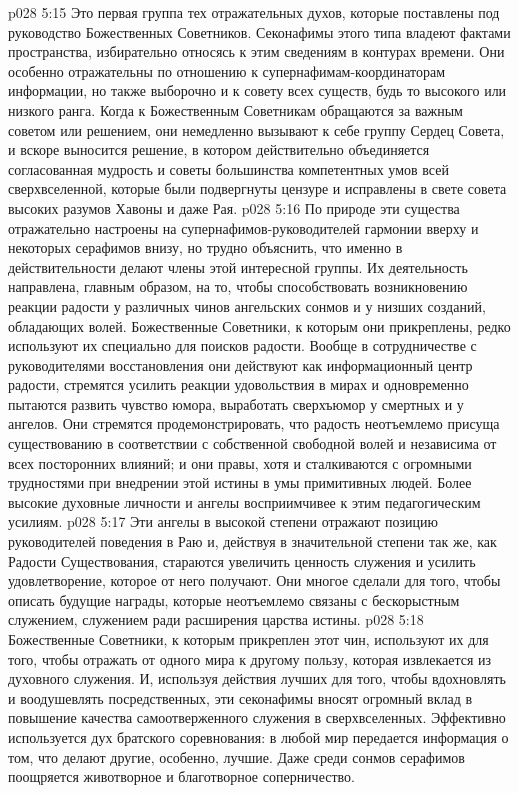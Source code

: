 \vs p028 5:15 \bibnobreakspace {} Это первая группа тех отражательных духов, которые поставлены под руководство Божественных Советников. Секонафимы этого типа владеют фактами пространства, избирательно относясь к этим сведениям в контурах времени. Они особенно отражательны по отношению к супернафимам\hyp{}координаторам информации, но также выборочно и к совету всех существ, будь то высокого или низкого ранга. Когда к Божественным Советникам обращаются за важным советом или решением, они немедленно вызывают к себе группу Сердец Совета, и вскоре выносится решение, в котором действительно объединяется согласованная мудрость и советы большинства компетентных умов всей сверхвселенной, которые были подвергнуты цензуре и исправлены в свете совета высоких разумов Хавоны и даже Рая.
\vs p028 5:16 \bibnobreakspace {} По природе эти существа отражательно настроены на супернафимов\hyp{}руководителей гармонии вверху и некоторых серафимов внизу, но трудно объяснить, что именно в действительности делают члены этой интересной группы. Их деятельность направлена, главным образом, на то, чтобы способствовать возникновению реакции радости у различных чинов ангельских сонмов и у низших созданий, обладающих волей. Божественные Советники, к которым они прикреплены, редко используют их специально для поисков радости. Вообще в сотрудничестве с руководителями восстановления они действуют как информационный центр радости, стремятся усилить реакции удовольствия в мирах и одновременно пытаются развить чувство юмора, выработать сверхъюмор у смертных и у ангелов. Они стремятся продемонстрировать, что радость неотъемлемо присуща существованию в соответствии с собственной свободной волей и независима от всех посторонних влияний; и они правы, хотя и сталкиваются с огромными трудностями при внедрении этой истины в умы примитивных людей. Более высокие духовные личности и ангелы восприимчивее к этим педагогическим усилиям.
\vs p028 5:17 \bibnobreakspace {} Эти ангелы в высокой степени отражают позицию руководителей поведения в Раю и, действуя в значительной степени так же, как Радости Существования, стараются увеличить ценность служения и усилить удовлетворение, которое от него получают. Они многое сделали для того, чтобы описать будущие награды, которые неотъемлемо связаны с бескорыстным служением, служением ради расширения царства истины.
\vs p028 5:18 Божественные Советники, к которым прикреплен этот чин, используют их для того, чтобы отражать от одного мира к другому пользу, которая извлекается из духовного служения. И, используя действия лучших для того, чтобы вдохновлять и воодушевлять посредственных, эти секонафимы вносят огромный вклад в повышение качества самоотверженного служения в сверхвселенных. Эффективно используется дух братского соревнования: в любой мир передается информация о том, что делают другие, особенно, лучшие. Даже среди сонмов серафимов поощряется животворное и благотворное соперничество.
